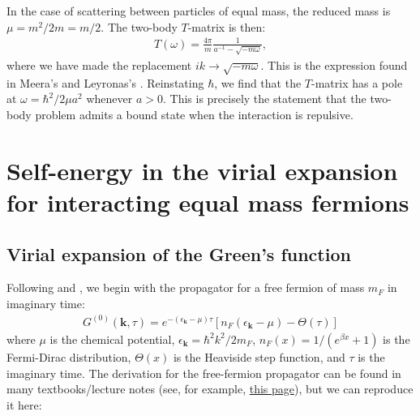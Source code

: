 \documentclass{article}
\theoremstyle{definition}
\begin{document}
\noindent In the case of scattering between particles of equal mass, the reduced mass is $\mu = m^2/2m = m/2$. The two-body $T$-matrix is then:
\begin{align}
T(\omega) =  \frac{4\pi}{m} \frac{1}{a^{-1} - \sqrt{- m\omega}},
\end{align}
where we have made the replacement $ik \to \sqrt{-m\omega}$. This is the expression found in Meera's \cite{mulkerin2024rabi} and Leyronas's \cite{sun2015high}. Reinstating $\hbar$, we find that the $T$-matrix has a pole at $\omega = \hbar^2/2\mu a^2$ whenever $a > 0$. This is precisely the statement that the two-body problem admits a bound state when the interaction is repulsive. 



\section{Self-energy in the virial expansion for interacting equal mass fermions}

\subsection{Virial expansion of the Green's function}

Following \cite{sun2015high} and \cite{leyronas2011virial}, we begin with the propagator for a free fermion of mass $m_F$ in imaginary time:
\begin{align}\label{eq:free-fermion}
G^{(0)}(\mathbf{k}, \tau) = e^{-(\epsilon_\mathbf{k} - \mu)\tau} [ n_F(\epsilon_\mathbf{k} - \mu) - \Theta(\tau)]
\end{align}
where $\mu$ is the chemical potential, $\epsilon_\mathbf{k} = \hbar^2 k^2 / 2m_F$, $n_F(x) = 1/(e^{\beta x} + 1)$ is the Fermi-Dirac distribution, $\Theta(x)$ is the Heaviside step function, and $\tau$ is the imaginary time. The derivation for the free-fermion propagator can be found in many textbooks/lecture notes (see, for example, \href{https://webspace.science.uu.nl/~morai101/oldWebsite/public_html/SFT06four.pdf}{this page}), but we can reproduce it here:\\
\end{document}
